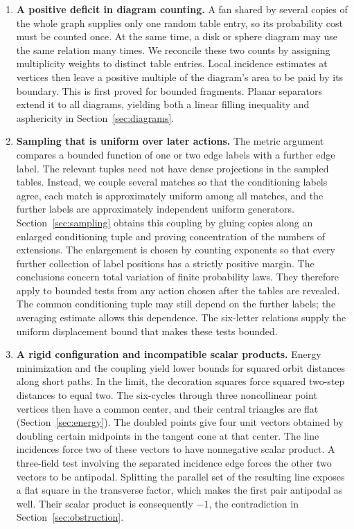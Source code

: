 \begin{enumerate}
\item \textbf{A positive deficit in diagram counting.}
A fan shared by several copies of the whole graph supplies only one random
table entry, so its probability cost must be counted once.  At the same time,
a disk or sphere diagram may use the same relation many times.  We reconcile
these two counts by assigning multiplicity weights to distinct table entries.
Local incidence estimates at vertices then leave a positive multiple
of the diagram's area to be paid by its boundary.  This is first proved for
bounded fragments.  Planar separators extend it to all diagrams, yielding
both a linear filling inequality and asphericity in
Section~\ref{sec:diagrams}.

\item \textbf{Sampling that is uniform over later actions.}
The metric argument compares a bounded function of one or two edge labels
with a further edge label.  The relevant tuples need not have dense
projections in the sampled tables.  Instead, we couple several matches
so that the conditioning labels agree, each match is approximately
uniform among all matches, and the further labels are approximately independent
uniform generators.  Section~\ref{sec:sampling} obtains this coupling by
gluing copies along an enlarged conditioning tuple and proving concentration
of the numbers of extensions.  The enlargement is chosen by counting
exponents so that every further collection of label positions has a strictly positive
margin.  The conclusions concern total variation of finite probability laws.  They therefore apply to bounded tests from any action
chosen after the tables are revealed.  The common conditioning tuple may still depend on the further labels; the
averaging estimate allows this dependence.  The six-letter relations supply
the uniform displacement bound that makes these tests bounded.

\item \textbf{A rigid configuration and incompatible scalar products.}
Energy minimization and the coupling yield lower bounds for squared orbit
distances along short paths.  In the limit, the decoration squares force
squared two-step distances to equal two.  The six-cycles through three noncollinear point vertices then have a
common center, and their central triangles are flat
(Section~\ref{sec:energy}).  The doubled points give four unit vectors obtained
by doubling certain midpoints in the tangent cone at that center.  The line
incidences force two of these vectors to have nonnegative scalar product.
A three-field test involving the separated incidence edge forces the other
two vectors to be antipodal.  Splitting the parallel set of the resulting line exposes a flat
square in the transverse factor, which makes the first pair antipodal as well.
Their scalar product is consequently $-1$, the contradiction in
Section~\ref{sec:obstruction}.
\end{enumerate}

